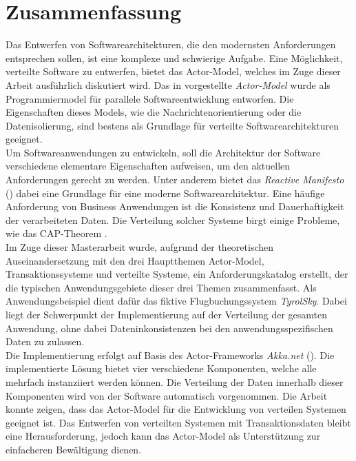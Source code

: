 \chapter*{Zusammenfassung}
Das Entwerfen von Softwarearchitekturen, die den modernsten Anforderungen entsprechen sollen, ist eine komplexe und schwierige Aufgabe. Eine Möglichkeit, verteilte Software zu entwerfen, bietet das Actor-Model, welches im Zuge dieser Arbeit ausführlich diskutiert wird. Das in \cite{Hewitt1973AIntelligence} vorgestellte \textit{Actor-Model} wurde als Programmiermodel für parallele Softwareentwicklung entworfen. Die Eigenschaften dieses Models, wie die Nachrichtenorientierung oder die Datenisolierung, sind bestens als Grundlage für verteilte Softwarearchitekturen geeignet. \\
Um Softwareanwendungen zu entwickeln, soll die Architektur der Software verschiedene elementare Eigenschaften aufweisen, um den aktuellen Anforderungen gerecht zu werden. Unter anderem bietet das \textit{Reactive Manifesto} (\cite{reactiveManifesto}) dabei eine Grundlage für eine moderne Softwarearchitektur. 
Eine häufige Anforderung von Business Anwendungen ist die Konsistenz und Dauerhaftigkeit der verarbeiteten Daten. Die Verteilung solcher Systeme birgt einige Probleme, wie das CAP-Theorem \citep{gilbertPerspectiveCAPTheorem2012}. \\
Im Zuge dieser Masterarbeit wurde, aufgrund der theoretischen Auseinandersetzung mit den drei Hauptthemen  Actor-Model, Transaktionssysteme und verteilte Systeme, ein Anforderungskatalog erstellt, der die typischen Anwendungsgebiete dieser drei Themen zusammenfasst. Als Anwendungsbeispiel dient dafür das fiktive Flugbuchungssystem \textit{TyrolSky}. Dabei liegt der Schwerpunkt der Implementierung auf der Verteilung der gesamten Anwendung, ohne dabei Dateninkonsistenzen bei den anwendungsspezifischen Daten zu zulassen. \\
Die Implementierung erfolgt auf Basis des Actor-Frameworks \textit{Akka.net} (\cite{Akka.netCommunityAkka.NETDocumentation}). Die implementierte Lösung bietet vier verschiedene Komponenten, welche alle mehrfach instanziiert werden können. Die Verteilung der Daten innerhalb dieser Komponenten wird von der Software automatisch vorgenommen.
Die Arbeit konnte zeigen, dass das Actor-Model für die Entwicklung von verteilen Systemen geeignet ist. Das Entwerfen von verteilten Systemen mit Transaktionsdaten bleibt eine Herausforderung, jedoch kann das Actor-Model als Unterstützung zur einfacheren Bewältigung dienen.

\cleardoublepage
